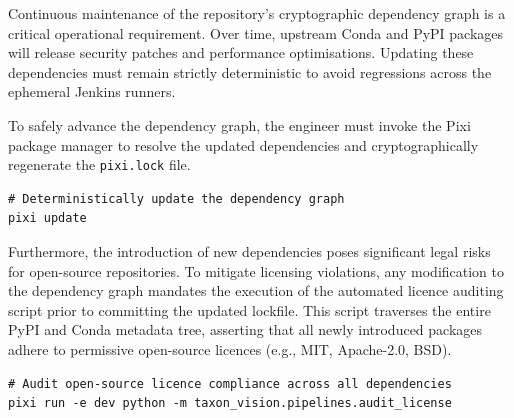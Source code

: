 Continuous maintenance of the repository's cryptographic dependency graph is a critical operational requirement. Over time, upstream Conda and PyPI packages will release security patches and performance optimisations. Updating these dependencies must remain strictly deterministic to avoid regressions across the ephemeral Jenkins runners.

To safely advance the dependency graph, the engineer must invoke the Pixi package manager to resolve the updated dependencies and cryptographically regenerate the \texttt{pixi.lock} file.

\begin{verbatim}
# Deterministically update the dependency graph
pixi update
\end{verbatim}

Furthermore, the introduction of new dependencies poses significant legal risks for open-source repositories. To mitigate licensing violations, any modification to the dependency graph mandates the execution of the automated licence auditing script prior to committing the updated lockfile. This script traverses the entire PyPI and Conda metadata tree, asserting that all newly introduced packages adhere to permissive open-source licences (e.g., MIT, Apache-2.0, BSD).

\begin{verbatim}
# Audit open-source licence compliance across all dependencies
pixi run -e dev python -m taxon_vision.pipelines.audit_license
\end{verbatim}
